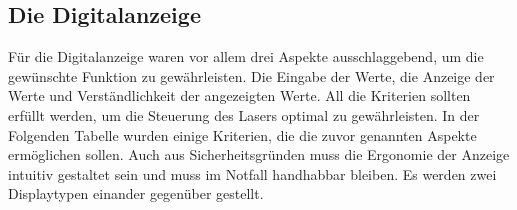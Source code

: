 % 
% 




\subsection{Die Digitalanzeige}
Für die Digitalanzeige waren vor allem drei Aspekte ausschlaggebend, um die gewünschte Funktion zu gewährleisten. Die Eingabe der Werte, die Anzeige der Werte und Verständlichkeit der angezeigten Werte. All die Kriterien sollten erfüllt werden, um die Steuerung des Lasers optimal zu gewährleisten. In der Folgenden Tabelle wurden einige Kriterien, die die zuvor genannten Aspekte ermöglichen sollen. Auch aus Sicherheitsgründen muss die Ergonomie der Anzeige intuitiv gestaltet sein und muss im Notfall handhabbar bleiben. Es werden zwei Displaytypen einander gegenüber gestellt.

